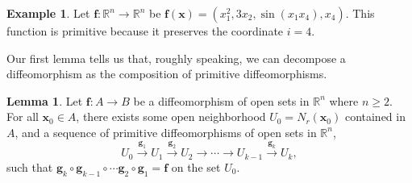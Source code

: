 \documentclass{article}
\newcommand{\R}{\mathbb{R}}
\newcommand{\x}{\mathbf{x}}
\newcommand{\f}{\mathbf{f}}
\theoremstyle{definition}
\newtheorem{lemma}{Lemma}[section]
\newtheorem{example}{Example}[section]
\begin{document}
\begin{example}
	Let $\f:\R^n\to \R^n$ be $\f(\x) = (x_1^2, 3x_2, \sin (x_1x_4), x_4)$. This function is primitive because it preserves the coordinate $i=4$.
\end{example}

Our first lemma tells us that, roughly speaking, we can decompose a diffeomorphism as the composition of primitive diffeomorphisms. 

\begin{lemma}
	Let $\f:A\to B$ be a diffeomorphism of open sets in $\R^n$ where $n\ge 2$. For all $\x_0 \in A$, there exists some open neighborhood $U_0 = N_r(\x_0)$ contained in $A$, and a sequence of primitive diffeomorphisms of open sets in $\R^n$, $$U_0 \overset{\mathbf g_1}{\longrightarrow}U_1\overset{\mathbf g_2}{\longrightarrow} U_2 \longrightarrow \cdots \longrightarrow U_{k-1}  \overset{\mathbf g_k}{\longrightarrow}U_k ,$$ such that $\mathbf g_k\circ \mathbf g_{k-1}\circ \cdots \mathbf g_2\circ \mathbf g_1 = \mathbf f$ on the set $U_0$.
\end{lemma}
\end{document}
